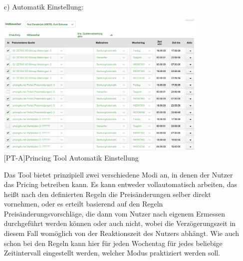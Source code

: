 \documentclass[12pt,a4paper,bibliography=totocnumbered,listof=totocnumbered]{scrartcl}
\begin{document}
\begin{enumerate}
\newpage
\item[c)] Automatik Einstellung:\\
\begin{center}
	\includegraphics[width=0.8\textwidth]{Bilder/automatik.png}\\
	[PT-A]{Princing Tool Automatik Einstellung}
	\label{fig:PT-A}
\end{center}                                                                          
Das Tool bietet prinzipiell zwei verschiedene Modi an, in denen der Nutzer das Pricing betreiben kann. Es kann entweder vollautomatisch arbeiten, das heißt nach den definierten Regeln die Preisänderungen selber direkt vornehmen, oder es erteilt basierend auf den Regeln Preisänderungsvorschläge, die dann vom Nutzer nach eigenem Ermessen durchgeführt werden können oder auch nicht, wobei die Verzögerungszeit in diesem Fall womöglich von der Reaktionszeit des Nutzers abhängt. Wie auch schon bei den Regeln kann hier für jeden Wochentag für jedes beliebige Zeitintervall eingestellt werden, welcher Modus praktiziert werden soll.
\end{enumerate}




\end{document}
